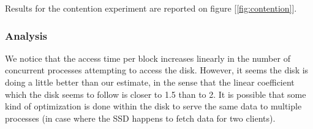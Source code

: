 Results for the contention experiment are reported on figure [\ref{fig:contention}].

\subsubsection{Analysis}

We notice that the access time per block increases linearly in the number of concurrent processes attempting to access the disk. However, it seems the disk is doing a little better than our estimate, in the sense that the linear coefficient which the disk seems to follow is closer to 1.5 than to 2. It is possible that some kind of optimization is done within the disk to serve the same data to multiple processes (in case where the SSD happens to fetch data for two clients). 

